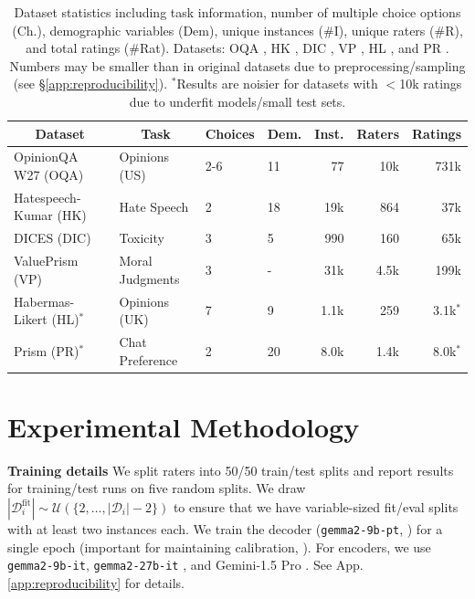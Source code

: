 \documentclass[11pt]{article}
\begin{document}
\begin{table}[h]
\centering
\small
\begin{tabular}{llllrrr}
\toprule
\multicolumn{1}{c}{\bf Dataset}  &\multicolumn{1}{c}{\bf Task}  &\multicolumn{1}{c}{\bf Choices}   &\multicolumn{1}{c}{\bf Dem.}   &\multicolumn{1}{c}{\bf Inst.}   &\multicolumn{1}{c}{\bf Raters}   &\multicolumn{1}{c}{\bf Ratings} \\
\hline
OpinionQA W27 (OQA) & Opinions (US) & 2-6 & 11 & 77 & 10k & 731k \\
Hatespeech-Kumar (HK) & Hate Speech & 2 & 18 & 19k & 864 & 37k \\
DICES (DIC) & Toxicity & 3 & 5 & 990 & 160 & 65k \\
ValuePrism (VP) & Moral Judgments & 3 & - & 31k & 4.5k & 199k \\
Habermas-Likert (HL)$^*$ & Opinions (UK) & 7 & 9 & 1.1k & 259 & 3.1k$^*$ \\
Prism (PR)$^*$
& Chat Preference & 2 & 20 & 8.0k & 1.4k & 8.0k$^*$ \\
\hline
\end{tabular}
\caption{
Dataset statistics including task information, number of multiple choice options (Ch.), demographic variables (Dem), unique instances (\#I), unique raters (\#R), and total ratings (\#Rat). Datasets: OQA \citep{santurkar2023opinionslanguagemodelsreflect}, HK \citep{kumar2021designingtoxiccontentclassification}, DIC \citep{aroyo2023dicesdatasetdiversityconversational}, VP \citep{Sorensen_Jiang_Hwang_Levine_Pyatkin_West_Dziri_Lu_Rao_Bhagavatula_Sap_Tasioulas_Choi_2024}, HL \citep{habermas}, and PR \citep{kirk2024prismalignmentdatasetparticipatory}. Numbers may be smaller than in original datasets due to preprocessing/sampling (see \S\ref{app:reproducibility}).
$^*$Results are noisier for datasets with $<$10k ratings due to underfit models/small test sets.
}
\label{tab:dataset_statistics}
\end{table}

\section{Experimental Methodology}
\label{sec:experimental methodology}

\textbf{Training details }
We split raters into 50/50 train/test splits and report results for training/test runs on five random splits. We draw $|\mathcal{D}_i^{\text{fit}}| \sim \mathcal{U}(\{2,\ldots,|\mathcal{D}_i|-2\})$ to ensure that we have variable-sized fit/eval splits with at least two instances each. We train the decoder (\texttt{gemma2-9b-pt}, \citealt{gemmateam2024gemma2improvingopen}) for a single epoch (important for maintaining calibration, \citealt{ji2021earlystoppedneuralnetworksconsistent}).  For encoders, we use \texttt{gemma2-9b-it}, \texttt{gemma2-27b-it} \citep{gemmateam2024gemma2improvingopen}, and Gemini-1.5 Pro \citep{geminiteam2024gemini15unlockingmultimodal}. See App. \ref{app:reproducibility} for details.
\end{document}
